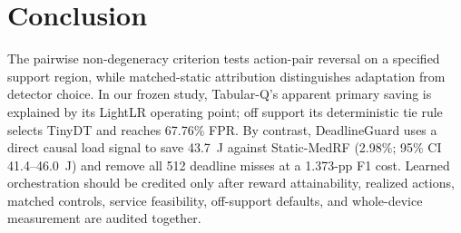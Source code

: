 \section{Conclusion}
\label{sec:conclude}
The pairwise non-degeneracy criterion tests action-pair reversal on a specified support region, while matched-static attribution distinguishes adaptation from detector choice. In our frozen study, Tabular-Q's apparent primary saving is explained by its LightLR operating point; off support its deterministic tie rule selects TinyDT and reaches 67.76\% FPR. By contrast, DeadlineGuard uses a direct causal load signal to save 43.7~J against Static-MedRF (2.98\%; 95\% CI 41.4--46.0~J) and remove all 512 deadline misses at a 1.373-pp F1 cost. Learned orchestration should be credited only after reward attainability, realized actions, matched controls, service feasibility, off-support defaults, and whole-device measurement are audited together.
